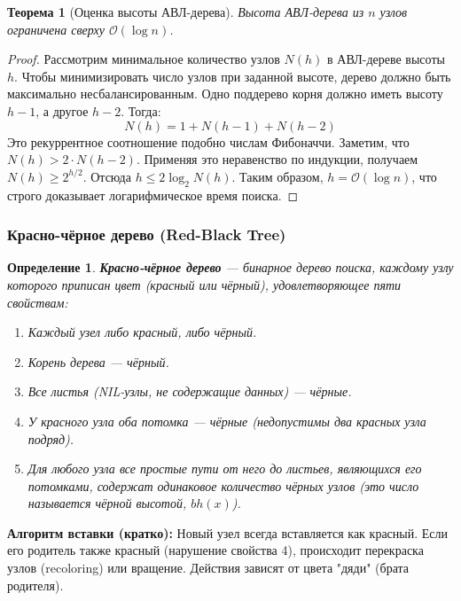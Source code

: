 \documentclass[12pt,a4paper]{article}
\newtheorem{definition}{Определение}
\newtheorem{theorem}{Теорема}
\begin{document}
\begin{theorem}[Оценка высоты АВЛ-дерева]
Высота АВЛ-дерева из $n$ узлов ограничена сверху $\mathcal{O}(\log n)$.
\end{theorem}
\begin{proof}
Рассмотрим минимальное количество узлов $N(h)$ в АВЛ-дереве высоты $h$. Чтобы минимизировать число узлов при заданной высоте, дерево должно быть максимально несбалансированным. Одно поддерево корня должно иметь высоту $h-1$, а другое $h-2$. Тогда:
$$ N(h) = 1 + N(h-1) + N(h-2) $$
Это рекуррентное соотношение подобно числам Фибоначчи. Заметим, что $N(h) > 2 \cdot N(h-2)$. Применяя это неравенство по индукции, получаем $N(h) \ge 2^{h/2}$.
Отсюда $h \le 2 \log_2 N(h)$. Таким образом, $h = \mathcal{O}(\log n)$, что строго доказывает логарифмическое время поиска.
\end{proof}

\subsubsection{Красно-чёрное дерево (Red-Black Tree)}
\begin{definition}
\textbf{Красно-чёрное дерево} — бинарное дерево поиска, каждому узлу которого приписан цвет (красный или чёрный), удовлетворяющее пяти свойствам:
\begin{enumerate}
    \item Каждый узел либо красный, либо чёрный.
    \item Корень дерева — чёрный.
    \item Все листья (NIL-узлы, не содержащие данных) — чёрные.
    \item У красного узла оба потомка — чёрные (недопустимы два красных узла подряд).
    \item Для любого узла все простые пути от него до листьев, являющихся его потомками, содержат одинаковое количество чёрных узлов (это число называется чёрной высотой, $bh(x)$).
\end{enumerate}
\end{definition}

\textbf{Алгоритм вставки (кратко):}
Новый узел всегда вставляется как красный. Если его родитель также красный (нарушение свойства 4), происходит перекраска узлов (recoloring) или вращение. Действия зависят от цвета "дяди" (брата родителя).
\end{document}
